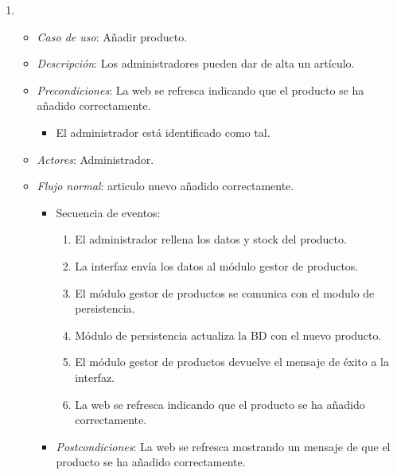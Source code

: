 \begin{enumerate}[{\bf UC-1}]
\begin{itemize}

  \end{itemize}

\item 
  \begin{itemize}
  \item {\it Caso de uso}: Añadir producto.
  \item {\it Descripción}: Los administradores pueden dar de alta un artículo.
  \item {\it Precondiciones}: La web se refresca indicando que el producto se ha añadido correctamente.
    \begin{itemize}
    \item El administrador está identificado como tal.
    \end{itemize}

  \item {\it Actores}: Administrador.

  \item {\it Flujo normal}: articulo nuevo añadido correctamente.
\begin{itemize}
\item Secuencia de eventos:
    \begin{enumerate}[1. ]
    \item El administrador rellena los datos y stock del producto.
    \item La interfaz envía los datos al módulo gestor de productos.
    \item El módulo gestor de productos se comunica con el modulo de persistencia.
    \item Módulo de persistencia actualiza la BD con el nuevo producto.
    \item El módulo gestor de productos devuelve el mensaje de éxito a la interfaz.
    \item La web se refresca indicando que el producto se ha añadido correctamente.

    \end{enumerate}

  \item {\it Postcondiciones}: La web se refresca mostrando un mensaje de que el producto se ha añadido correctamente.
\end{itemize}



\end{itemize}
\end{enumerate}
